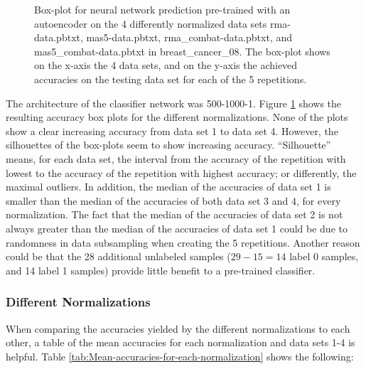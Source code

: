 \begin{figure}
\begin{centering}
\begin{tabular}{cc}
\end{tabular}
\par\end{centering}
\caption[Box-plot for neural network prediction pre-trained with an autoencoder
on differently normalized data sets.]{\label{fig:accuracy-plots-for-breast_cancer_08}Box-plot for neural
network prediction pre-trained with an autoencoder on the 4 differently
normalized data sets rma-data.pbtxt, mas5-data.pbtxt, rma\_combat-data.pbtxt,
and mas5\_combat-data.pbtxt in breast\_cancer\_08. The box-plot shows
on the x-axis the 4 data sets, and on the y-axis the achieved accuracies
on the testing data set for each of the 5 repetitions.}
\end{figure}
The architecture of the classifier network was 500-1000-1. Figure
\ref{fig:accuracy-plots-for-breast_cancer_08} shows the resulting
accuracy box plots for the different normalizations. None of the plots
show a clear increasing accuracy from data set 1 to data set 4. However,
the silhouettes of the box-plots seem to show increasing accuracy.
``Silhouette'' means, for each data set, the interval from the accuracy
of the repetition with lowest to the accuracy of the repetition with
highest accuracy; or differently, the maximal outliers. In addition,
the median of the accuracies of data set 1 is smaller than the median
of the accuracies of both data set 3 and 4, for every normalization.
The fact that the median of the accuracies of data set 2 is not always
greater than the median of the accuracies of data set 1 could be due
to randomness in data subsampling when creating the 5 repetitions.
Another reason could be that the 28 additional unlabeled samples ($29-15=14$
label 0 samples, and 14 label 1 samples) provide little benefit to
a pre-trained classifier.

\subsubsection{Different Normalizations}

When comparing the accuracies yielded by the different normalizations
to each other, a table of the mean accuracies for each normalization
and data sets 1-4 is helpful. Table \ref{tab:Mean-accuracies-for-each-normalization}
shows the following:

